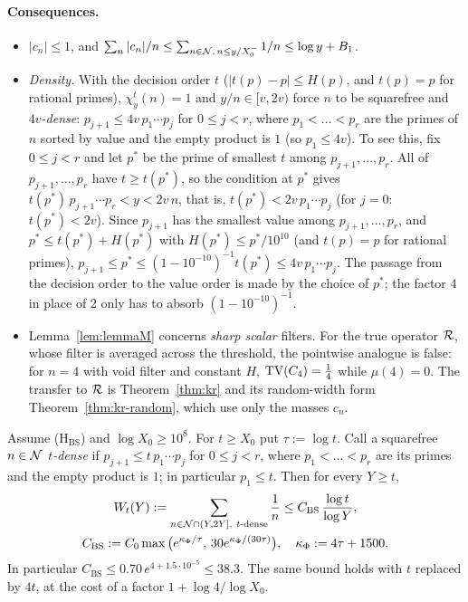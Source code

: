 \paragraph{Consequences.}
\begin{itemize}
\item $|c_n|\le1$, and $\sum_n|c_n|/n\le\sum_{n\in\mathcal{N},\,n\le y/X_0^{-}}1/n\le\log y+B_1$.
\item \emph{Density.} With the decision order $t$ ($|t(p)-p|\le H(p)$, and $t(p)=p$ for rational primes),
  $\chi^t_y(n)=1$ and $y/n\in[v,2v)$ force $n$ to be squarefree and \emph{$4v$-dense}: $p_{j+1}\le4v\,p_1\cdots p_j$ for
  $0\le j<r$, where $p_1<\dots<p_r$ are the primes of $n$ sorted by value and the empty product is $1$ (so $p_1\le4v$).
  To see this, fix $0\le j<r$ and let $p^*$ be the prime of smallest $t$ among $p_{j+1},\dots,p_r$. All of
  $p_{j+1},\dots,p_r$ have $t\ge t(p^*)$, so the condition at $p^*$ gives $t(p^*)\,p_{j+1}\cdots p_r<y<2v\,n$, that is,
  $t(p^*)<2v\,p_1\cdots p_j$ (for $j=0$: $t(p^*)<2v$). Since $p_{j+1}$ has the smallest value among $p_{j+1},\dots,p_r$,
  and $p^*\le t(p^*)+H(p^*)$ with $H(p^*)\le p^*/10^{10}$ (and $t(p)=p$ for rational primes),
  $p_{j+1}\le p^*\le(1-10^{-10})^{-1}t(p^*)\le4v\,p_1\cdots p_j$. The passage from the decision order to the value order is
  made by the choice of $p^*$; the factor $4$ in place of $2$ only has to absorb $(1-10^{-10})^{-1}$.
\item Lemma~\ref{lem:lemmaM} concerns \emph{sharp scalar} filters. For the true operator $\mathcal{R}$, whose filter is
  averaged across the threshold, the pointwise analogue is false: for $n=4$ with void filter and constant $H$,
  $\operatorname{TV}(C_4)=\frac14$ while $\mu(4)=0$. The transfer to $\mathcal{R}$ is Theorem~\ref{thm:kr} and its random-width form Theorem~\ref{thm:kr-random}, which use only the masses $c_n$.
\end{itemize}

\begin{theorem}\label{thm:bs}
Assume \textup{(H$_{\mathrm{BS}}$)} and $\log X_0\ge10^8$. For $t\ge X_0$ put $\tau:=\log t$. Call a squarefree $n\in\mathcal{N}$
\emph{$t$-dense} if $p_{j+1}\le t\,p_1\cdots p_j$ for $0\le j<r$, where $p_1<\dots<p_r$ are its primes and the empty product
is $1$; in particular $p_1\le t$. Then for every $Y\ge t$,
\begin{gather*}
  W_t(Y):=\sum_{n\in\mathcal{N}\cap(Y,2Y],\ t\text{-dense}}\frac1n\le C_{\mathrm{BS}}\,\frac{\log t}{\log Y},\\
  C_{\mathrm{BS}}:=C_0\max\big(e^{\kappa_\Phi/\tau},\,30e^{\kappa_\Phi/(30\tau)}\big),\quad\kappa_\Phi:=4\tau+1500 .
\end{gather*}
In particular $C_{\mathrm{BS}}\le0.70\,e^{4+1.5\cdot10^{-5}}\le38.3$. The same bound holds with $t$ replaced by $4t$, at
the cost of a factor $1+\log4/\log X_0$.
\end{theorem}

